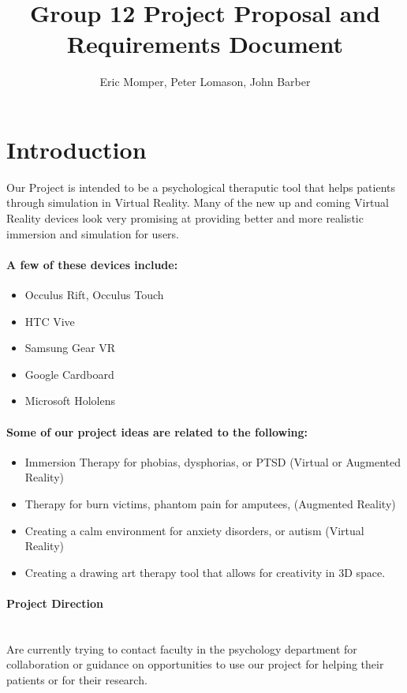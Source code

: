 \documentclass[a4paper,10pt]{article}
\title{Group 12 Project Proposal and Requirements Document}
\author{Eric Momper, Peter Lomason, John Barber}
\begin{document}
\maketitle

\pagebreak
\tableofcontents
\pagebreak

\section{Introduction}
Our Project is intended to be a psychological theraputic tool that helps patients through simulation in Virtual Reality.
Many of the new up and coming Virtual Reality devices look very promising at providing better and more realistic immersion and simulation for users. 
\\
\paragraph{A few of these devices include:}
\begin{itemize}
 \item Occulus Rift, Occulus Touch
 \item HTC Vive
 \item Samsung Gear VR
 \item Google Cardboard
 \item Microsoft Hololens
\end{itemize}

\paragraph{ Some of our project ideas are related to the following:}
\begin{itemize}
 \item ​Immersion Therapy for phobias, dysphorias, or PTSD (Virtual or Augmented Reality)
 \item Therapy for burn victims, phantom pain for amputees,  (Augmented Reality)
 \item Creating a calm environment for  anxiety disorders, or autism (Virtual Reality)
 \item Creating a drawing art therapy tool that allows for creativity in 3D space. 
\end{itemize}


\paragraph{Project Direction} ~\\ Are currently trying to contact faculty in the psychology department for collaboration or 
guidance on opportunities to use our project for helping their patients or for their research.
\end{document}
